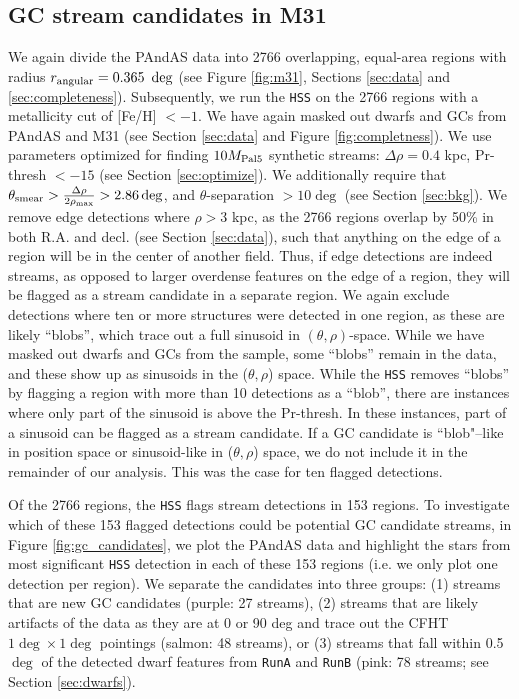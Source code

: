 \documentclass[twocolumn]{aastex631}
\begin{document}
\subsection{GC stream candidates in M31}\label{sec:resrht}
We again divide the PAndAS data into 2766 overlapping, equal-area regions with radius $r_{\rm angular} = 0.365~ \deg$ (see Figure \ref{fig:m31}, Sections \ref{sec:data} and \ref{sec:completeness}). Subsequently, we run the \texttt{HSS} on the 2766 regions with a metallicity cut of [Fe/H] $<-1$. 
We have again masked out dwarfs and GCs from PAndAS \citep{huxor14,martin17,McConnachie19} and M31 (see Section \ref{sec:data} and Figure \ref{fig:completness}).
We use parameters optimized for finding $10{M}_{\rm Pal 5}$ synthetic streams: $\Delta \rho = 0.4$ kpc, Pr-thresh $<-15$ (see Section \ref{sec:optimize}). We additionally require that $\theta_{\rm smear} > \frac{\Delta \rho}{2\rho_{\rm max}} > 2.86 \deg$, and $\theta$-separation $>10\deg$ (see Section \ref{sec:bkg}). We remove edge detections where $\rho>3$ kpc, as the 2766 regions overlap by 50\% in both R.A. and decl. (see Section \ref{sec:data}), such that anything on the edge of a region will be in the center of another field. Thus, if edge detections are indeed streams, as opposed to larger overdense features on the edge of a region, they will be flagged as a stream candidate in a separate region. We again exclude detections where ten or more structures were detected in one region, as these are likely ``blobs'', which trace out a full sinusoid in $(\theta,\rho)$-space. While we have masked out dwarfs and GCs from the sample, some ``blobs'' remain  in the data, and these show up as sinusoids in the ($\theta,\rho$) space. While the \texttt{HSS} removes ``blobs'' by flagging a region with more than 10 detections as a ``blob'', there are instances where only part of the sinusoid is above the Pr-thresh. In these instances, part of a sinusoid can be flagged as a stream candidate. If a GC candidate is ``blob"--like in position space or sinusoid-like in ($\theta,\rho$) space, we do not include it in the remainder of our analysis. This was the case for ten flagged detections. 

Of the 2766 regions, the \texttt{HSS} flags stream detections in 153 regions. To investigate which of these 153 flagged detections could be potential GC candidate streams, in Figure \ref{fig:gc_candidates}, we plot the PAndAS data and highlight the stars from most significant \texttt{HSS} detection in each of these 153 regions (i.e. we only plot one detection per region).  We separate the candidates into three groups: (1) streams that are new GC candidates (purple: 27 streams), (2) streams that are likely artifacts of the data as they are at 0 or 90 deg and trace out the CFHT $1\deg \times1\deg$ pointings (salmon: 48 streams), or (3) streams that fall within 0.5 $\deg$ of the detected dwarf features from \texttt{RunA} and \texttt{RunB} (pink: 78 streams; see Section \ref{sec:dwarfs}). 
\end{document}
